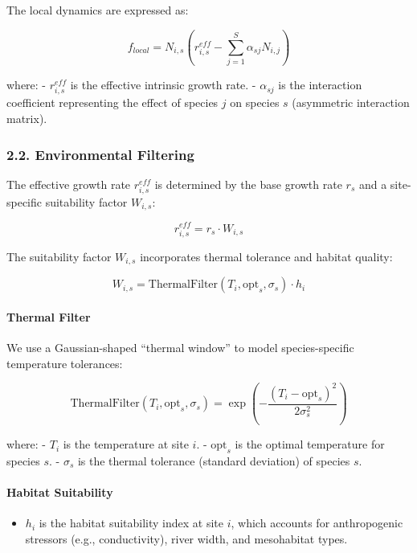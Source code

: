 The local dynamics are expressed as:

\[f_{local} = N_{i,s} \left( r_{i,s}^{eff} - \sum_{j=1}^{S} \alpha_{sj} N_{i,j} \right)\]

where: - \(r_{i,s}^{eff}\) is the effective intrinsic growth rate. -
\(\alpha_{sj}\) is the interaction coefficient representing the effect
of species \(j\) on species \(s\) (asymmetric interaction matrix).

\hypertarget{environmental-filtering}{%
\subsubsection{2.2. Environmental
Filtering}\label{environmental-filtering}}

The effective growth rate \(r_{i,s}^{eff}\) is determined by the base
growth rate \(r_{s}\) and a site-specific suitability factor
\(W_{i,s}\):

\[r_{i,s}^{eff} = r_{s} \cdot W_{i,s}\]

The suitability factor \(W_{i,s}\) incorporates thermal tolerance and
habitat quality:

\[W_{i,s} = \text{ThermalFilter}(T_i, \text{opt}_s, \sigma_s) \cdot h_i\]

\hypertarget{thermal-filter}{%
\paragraph{Thermal Filter}\label{thermal-filter}}

We use a Gaussian-shaped ``thermal window'' to model species-specific
temperature tolerances:

\[\text{ThermalFilter}(T_i, \text{opt}_s, \sigma_s) = \exp\left( -\frac{(T_i - \text{opt}_s)^2}{2\sigma_s^2} \right)\]

where: - \(T_i\) is the temperature at site \(i\). - \(\text{opt}_s\) is
the optimal temperature for species \(s\). - \(\sigma_s\) is the thermal
tolerance (standard deviation) of species \(s\).

\hypertarget{habitat-suitability}{%
\paragraph{Habitat Suitability}\label{habitat-suitability}}

\begin{itemize}
\tightlist
\item
  \(h_i\) is the habitat suitability index at site \(i\), which accounts
  for anthropogenic stressors (e.g., conductivity), river width, and
  mesohabitat types.
\end{itemize}

